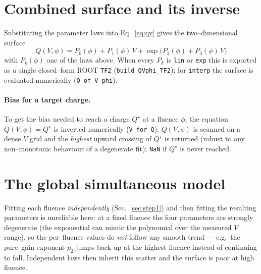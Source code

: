 \documentclass[11pt]{article}
\newcommand{\code}[1]{\texttt{#1}}
\begin{document}
\section{Combined surface and its inverse}
Substituting the parameter laws into Eq.~\ref{eq:qv} gives the two--dimensional
surface
\begin{equation}
  \boxed{\,Q(V,\phi) = P_0(\phi) + P_1(\phi)\,V +
          \exp\!\big(P_2(\phi) + P_3(\phi)\,V\big)\,}
\end{equation}
with $P_k(\phi)$ one of the laws above. When every $P_k$ is \code{lin} or
\code{exp} this is exported as a single closed--form ROOT \code{TF2}
(\code{build\_QVphi\_TF2}); for \code{interp} the surface is evaluated
numerically (\code{Q\_of\_V\_phi}).

\paragraph{Bias for a target charge.} To get the bias needed to reach a charge
$Q^\star$ at a fluence $\phi$, the equation $Q(V,\phi)=Q^\star$ is inverted
numerically (\code{V\_for\_Q}): $Q(V,\phi)$ is scanned on a dense $V$ grid and the
\emph{highest} upward crossing of $Q^\star$ is returned (robust to any
non--monotonic behaviour of a degenerate fit); \code{NaN} if $Q^\star$ is never
reached.

\section{The global simultaneous model}
\label{sec:global}
Fitting each fluence \emph{independently} (Sec.~\ref{sec:step1}) and then fitting
the resulting parameters is unreliable here: at a fixed fluence the four
parameters are strongly degenerate (the exponential can mimic the polynomial over
the measured $V$ range), so the per--fluence values do \emph{not} follow any
smooth trend --- e.g.\ the pure--gain exponent $p_2$ jumps back up at the highest
fluence instead of continuing to fall. Independent laws then inherit this scatter
and the surface is poor at high fluence.
\end{document}
